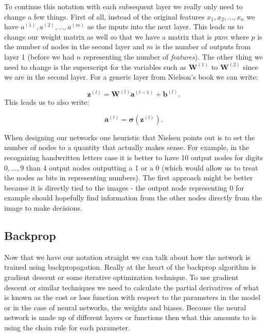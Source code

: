 To continue this notation with each subsequent layer we really only need to change a few things. First of all, instead of the original features $x_1, x_2, ..., x_n$ we have $a^{(1)}, a^{(2)}, ..., a^{(m)}$ as the inputs into the next layer. This leads us to change our weight matrix as well so that we have a matrix that is $p$x$m$ where $p$ is the number of nodes in the second layer and $m$ is the number of outputs from layer 1 (before we had $n$ representing the number of \emph{features}). The other thing we need to change is the superscript for the variables such as $\mathbf{W}^{(1)}$ to $\mathbf{W}^{(2)}$ since we are in the second layer. For a generic layer from Nielson's book we can write:

\begin{equation}
\mathbf{z}^{(l)} = \mathbf{W}^{(l)} \mathbf{a}^{(l-1)} + \mathbf{b}^{(l)}.
\end{equation}
\noindent This leads us to also write:

\begin{equation}
\mathbf{a}^{(l)} = \mathbf{\sigma}(\mathbf{z}^{(l)}).
\end{equation}

When designing our networks one heuristic that Nielsen points out is to set the number of nodes to a quantity that actually makes sense. For example, in the recognizing handwritten letters case it is better to have 10 output nodes for digits $0,...,9$ than 4 output nodes outputting a 1 or a 0 (which would allow us to treat the nodes as bits in representing numbers). The first approach might be better because it is directly tied to the images - the output node representing 0 for example should hopefully find information from the other nodes directly from the image to make decisions.


\subsection{Backprop}

Now that we have our notation straight we can talk about how the network is trained using backpropagation. Really at the heart of the backprop algorithm is gradient descent or some iterative optimization technique. To use gradient descent or similar techniques we need to calculate the partial derivatives of what is known as the cost or loss function with respect to the parameters in the model or in the case of neural networks, the weights and biases. Because the neural network is made up of different layers or functions then what this amounts to is using the chain rule for each parameter.

